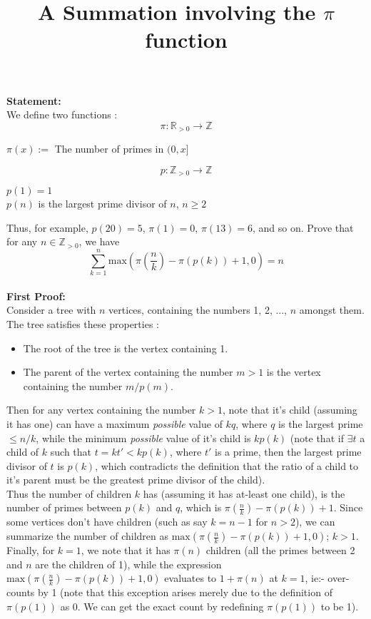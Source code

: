 \documentclass{article}
\title{\textbf{A Summation involving the $\pi$ function}}
\begin{document}
\maketitle
\noindent
{\bf Statement:}\\ 
We define two functions :
$$ \pi : \mathbb{R}_{>0}\longrightarrow\mathbb{Z} $$
\begin{center}
    $ \pi(x) := $ The number of primes in $ (0, x] $
\end{center}
$$ p : \mathbb{Z}_{>0}\longrightarrow\mathbb{Z} $$
\begin{center}
    $p(1) = 1$\\
    $p(n)$ is the largest prime divisor of  $n$, $n \geq 2$
\end{center}
Thus, for example, $p(20) = 5$, $\pi(1) = 0$, $\pi(13) = 6$, and so on.
Prove that for any $n \in \mathbb{Z}_{>0}$, we have\\
$$\sum_{k=1}^{n} \mathrm{max}(\pi(\frac{n}{k}) - \pi(p(k)) + 1, 0) = n$$
\\
\noindent
{\bf First Proof:}\\ 
Consider a tree with $n$ vertices, containing the numbers 1, 2, ..., $n$ amongst them. The tree satisfies these properties :
\begin{itemize}
    \item The root of the tree is the vertex containing 1.
    \item The parent of the vertex containing the number $m > 1$ is the vertex containing the number $m/p(m)$.
\end{itemize}
Then for any vertex containing the number $k > 1$, note that it's child (assuming it has one) can have a maximum \emph{possible} value of $kq$, where $q$ is the largest prime $\leq n/k$, while the minimum \emph{possible} value of it's child is $kp(k)$ (note that if $\exists t$ a child of $k$ such that $t = kt' < kp(k)$, where $t'$ is a prime, then the largest prime divisor of $t$ is $p(k)$, which contradicts the definition that the ratio of a child to it's parent must be the greatest prime divisor of the child).\\
Thus the number of children $k$ has (assuming it has at-least one child), is the number of primes between $p(k)$ and $q$, which is $\pi(\frac{n}{k}) - \pi(p(k)) + 1$. Since some vertices don't have children (such as say $k = n -1$ for $n > 2$), we can summarize the number of children as $\mathrm{max}(\pi(\frac{n}{k}) - \pi(p(k)) + 1, 0)$; $k > 1$.\\
Finally, for $k = 1$, we note that it has $\pi(n)$ children (all the primes between 2 and $n$ are the children of 1), while the expression $\mathrm{max}(\pi(\frac{n}{k}) - \pi(p(k)) + 1, 0)$ evaluates to $1 + \pi(n)$ at $k = 1$, ie:- over-counts by 1 (note that this exception arises merely due to the definition of $\pi(p(1))$ as 0. We can get the exact count by redefining $\pi(p(1))$ to be 1).\\
\end{document}
